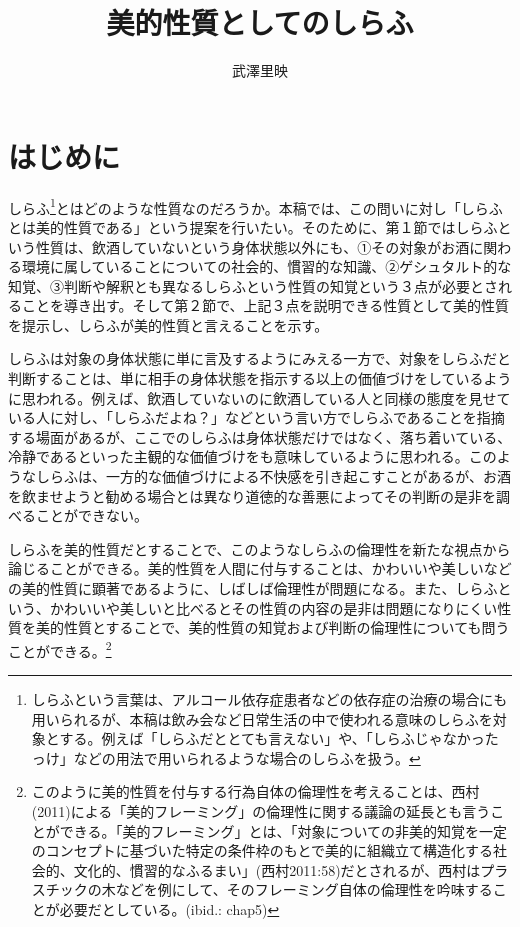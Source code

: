 \documentclass[b5j,twoside,twocolumn]{utarticle}
\title{美的性質としてのしらふ}
\author{武澤里映}
\date{\vspace{-5mm}}
\makeatletter
\def\yakuchu{%
\@ifnextchar[\@xfootnote %
{\stepcounter{yakuchu}%
\protected@xdef\@thefnmark{\theyakuchu}%
\@footnotemark\@footnotetext}}
\makeatother
\begin{document}
\maketitle

\setlength{\footskip}{-2mm}
\chead[]{}
\rhead[美的性質としてのしらふ]{}
\lfoot[]{\thepage{}}
\cfoot[]{}
\rfoot[\thepage{}]{}

\let\yakuchu=\endnote
\renewcommand{\footnoterule}{\noindent\rule{100mm}{0.3mm}\vskip2mm}
\thispagestyle{fancy}
\section*{はじめに}
しらふ\footnote{しらふという言葉は、アルコール依存症患者などの依存症の治療の場合にも用いられるが、本稿は飲み会など日常生活の中で使われる意味のしらふを対象とする。例えば「しらふだととても言えない」や、「しらふじゃなかったっけ」などの用法で用いられるような場合のしらふを扱う。}とはどのような性質なのだろうか。本稿では、この問いに対し「しらふとは美的性質である」という提案を行いたい。そのために、第１節ではしらふという性質は、飲酒していないという身体状態以外にも、①その対象がお酒に関わる環境に属していることについての社会的、慣習的な知識、②ゲシュタルト的な知覚、③判断や解釈とも異なるしらふという性質の知覚という３点が必要とされることを導き出す。そして第２節で、上記３点を説明できる性質として美的性質を提示し、しらふが美的性質と言えることを示す。

しらふは対象の身体状態に単に言及するようにみえる一方で、対象をしらふだと判断することは、単に相手の身体状態を指示する以上の価値づけをしているように思われる。例えば、飲酒していないのに飲酒している人と同様の態度を見せている人に対し、「しらふだよね？」などという言い方でしらふであることを指摘する場面があるが、ここでのしらふは身体状態だけではなく、落ち着いている、冷静であるといった主観的な価値づけをも意味しているように思われる。このようなしらふは、一方的な価値づけによる不快感を引き起こすことがあるが、お酒を飲ませようと勧める場合とは異なり道徳的な善悪によってその判断の是非を調べることができない。

しらふを美的性質だとすることで、このようなしらふの倫理性を新たな視点から論じることができる。美的性質を人間に付与することは、かわいいや美しいなどの美的性質に顕著であるように、しばしば倫理性が問題になる。また、しらふという、かわいいや美しいと比べるとその性質の内容の是非は問題になりにくい性質を美的性質とすることで、美的性質の知覚および判断の倫理性についても問うことができる。\footnote{このように美的性質を付与する行為自体の倫理性を考えることは、西村(2011)による「美的フレーミング」の倫理性に関する議論の延長とも言うことができる。「美的フレーミング」とは、「対象についての非美的知覚を一定のコンセプトに基づいた特定の条件枠のもとで美的に組織立て構造化する社会的、文化的、慣習的なふるまい」(西村2011:58)だとされるが、西村はプラスチックの木などを例にして、そのフレーミング自体の倫理性を吟味することが必要だとしている。(ibid.: chap5)}
\end{document}
